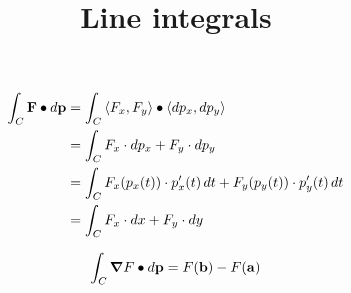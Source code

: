 \documentclass{ximera}
\title[Dig-In:]{Line integrals}
\begin{document}
\begin{abstract}
\end{abstract}
\maketitle


\begin{align*}
  \int_C \vec{F}\dotp \d \vec{p} &= \int_C \vector{F_x,F_y}\dotp\vector{\d p_x,\d p_y}\\
  &= \int_C F_x\cdot \d p_x + F_y\cdot \d p_y\\
  &= \int_C F_x(p_x(t))\cdot p'_x(t) \d t + F_y(p_y(t))\cdot  p'_y(t) \d t\\
  &= \int_C F_x\cdot \d x  + F_y\cdot  \d y
\end{align*}


\[
\int_C \boldsymbol\nabla F\bullet \mathop{}\!d \mathbf{p} = F(\mathbf{b}) - F(\mathbf{a})
\]
\end{document}
